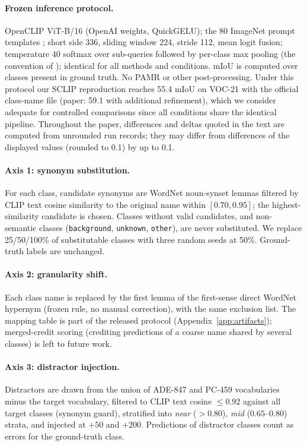 \documentclass[11pt]{article}
\newcommand{\miou}{mIoU}
\begin{document}
\paragraph{Frozen inference protocol.} OpenCLIP \citep{ilharco2021openclip} ViT-B/16
(OpenAI weights, QuickGELU); the 80 ImageNet prompt templates
\citep{radford2021clip}; short side 336, sliding window 224, stride 112, mean
logit fusion; temperature 40 softmax over sub-queries followed by per-class max pooling
(the convention of \citet{wang2024sclip}); identical for all methods and conditions.
\miou{} is computed over classes present in ground truth. No PAMR
\citep{araslanov2020pamr} or other post-processing. Under this protocol our SCLIP reproduction reaches 55.4 \miou{} on
VOC-21 with the official class-name file (paper: 59.1 with additional refinement),
which we consider adequate for controlled comparisons since all conditions share the
identical pipeline. Throughout the paper, differences and deltas quoted in the text
are computed from unrounded run records; they may differ from differences of the
displayed values (rounded to 0.1) by up to 0.1.

\paragraph{Axis 1: synonym substitution.} For each class, candidate synonyms are
WordNet \citep{miller1995wordnet} noun-synset lemmas filtered by CLIP text cosine similarity to the original name
within $[0.70, 0.95]$; the highest-similarity candidate is chosen. Classes without
valid candidates, and non-semantic classes (\texttt{background}, \texttt{unknown},
\texttt{other}), are never substituted. We replace 25/50/100\% of substitutable classes
with three random seeds at 50\%. Ground-truth labels are unchanged.

\paragraph{Axis 2: granularity shift.} Each class name is replaced by the first lemma
of the first-sense direct WordNet hypernym (frozen rule, no manual correction), with the
same exclusion list. The mapping table is part of the released protocol
(Appendix~\ref{app:artifacts}); merged-credit scoring (crediting predictions of a
coarse name shared by several classes) is left to future work.

\paragraph{Axis 3: distractor injection.} Distractors are drawn from the union of
ADE-847 and PC-459 vocabularies minus the target vocabulary, filtered to CLIP text
cosine $\le 0.92$ against all target classes (synonym guard), stratified into
\emph{near} ($>0.80$), \emph{mid} ($0.65$--$0.80$) strata, and injected at $+50$ and
$+200$. Predictions of distractor classes count as errors for the ground-truth class.
\end{document}
